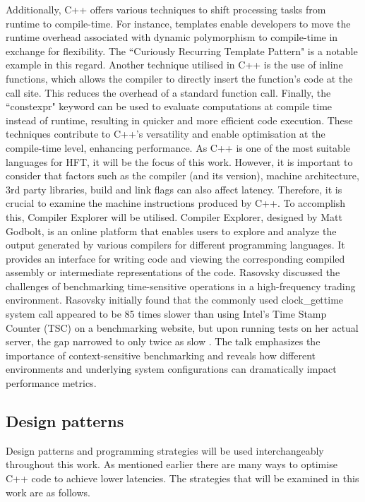\documentclass{article}
\theoremstyle{break}
\begin{document}
Additionally, C++ offers various techniques to shift processing tasks from runtime to compile-time. For instance, templates enable developers to move the runtime overhead associated with dynamic polymorphism to compile-time in exchange for flexibility. The ``Curiously Recurring Template Pattern" is a notable example in this regard.
Another technique utilised in C++ is the use of inline functions, which allows the compiler to directly insert the function's code at the call site. This reduces the overhead of a standard function call. Finally, the ``constexpr" keyword can be used to evaluate computations at compile time instead of runtime, resulting in quicker and more efficient code execution. These techniques contribute to C++'s versatility and enable optimisation at the compile-time level, enhancing performance. As C++ is one of the most suitable languages for HFT, it will be the focus of this work.
However, it is important to consider that factors such as the compiler (and its version), machine architecture, 3rd party libraries, build and link flags can also affect latency. Therefore, it is crucial to examine the machine instructions produced by C++. To accomplish this, Compiler Explorer will be utilised. Compiler Explorer, designed by Matt Godbolt, is an online platform that enables users to explore and analyze the output generated by various compilers for different programming languages. It provides an interface for writing code and viewing the corresponding compiled assembly or intermediate representations of the code. Rasovsky discussed the challenges of benchmarking time-sensitive operations in a high-frequency trading environment. Rasovsky initially found that the commonly used clock\_gettime system call appeared to be 85 times slower than using Intel's Time Stamp Counter (TSC) on a benchmarking website, but upon running tests on her actual server, the gap narrowed to only twice as slow \cite{rasovsky}. The talk emphasizes the importance of context-sensitive benchmarking and reveals how different environments and underlying system configurations can dramatically impact performance metrics.



\subsection{Design patterns}
Design patterns and programming strategies will be used interchangeably throughout this work. As mentioned earlier there are many ways to optimise C++ code to achieve lower latencies. The strategies that will be examined in this work are as follows.
\end{document}
